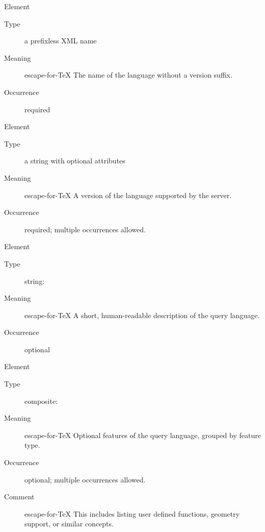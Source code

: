 \documentclass{ivoa}
\begin{document}
\begingroup\small\begin{bigdescription}\item[Element \xmlel{name}]
\begin{description}
\item[Type] a prefixless XML name
\item[Meaning] escape-for-TeX{{{
          The name of the language without a version suffix.
          }}}
\item[Occurrence] required

\end{description}
\item[Element \xmlel{version}]
\begin{description}
\item[Type] a string with optional attributes
\item[Meaning] escape-for-TeX{{{
            A version of the language supported by the server.
          }}}
\item[Occurrence] required; multiple occurrences allowed.

\end{description}
\item[Element \xmlel{description}]
\begin{description}
\item[Type] string: 
\item[Meaning] escape-for-TeX{{{
          A short, human-readable description of the
          query language.
          }}}
\item[Occurrence] optional

\end{description}
\item[Element \xmlel{languageFeatures}]
\begin{description}
\item[Type] composite: 
\item[Meaning] escape-for-TeX{{{
            Optional features of the query language, grouped by
            feature type.
          }}}
\item[Occurrence] optional; multiple occurrences allowed.
\item[Comment] escape-for-TeX{{{
            This includes listing user defined functions, geometry support,
            or similar concepts.
          }}}

\end{description}


\end{bigdescription}\endgroup
\end{document}
